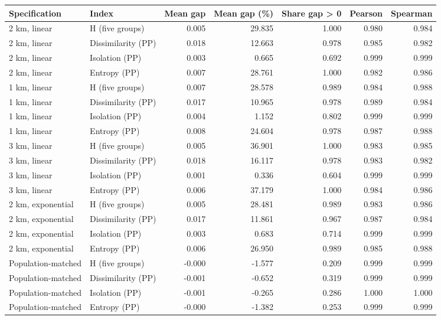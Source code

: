 \begin{tabular}{llrrrrr}
\toprule
Specification & Index & Mean gap & Mean gap (\%) & Share gap > 0 & Pearson & Spearman \\
\midrule
2 km, linear & H (five groups) & 0.005 & 29.835 & 1.000 & 0.980 & 0.984 \\
2 km, linear & Dissimilarity (PP) & 0.018 & 12.663 & 0.978 & 0.985 & 0.982 \\
2 km, linear & Isolation (PP) & 0.003 & 0.665 & 0.692 & 0.999 & 0.999 \\
2 km, linear & Entropy (PP) & 0.007 & 28.761 & 1.000 & 0.982 & 0.986 \\
1 km, linear & H (five groups) & 0.007 & 28.578 & 0.989 & 0.984 & 0.988 \\
1 km, linear & Dissimilarity (PP) & 0.017 & 10.965 & 0.978 & 0.989 & 0.984 \\
1 km, linear & Isolation (PP) & 0.004 & 1.152 & 0.802 & 0.999 & 0.999 \\
1 km, linear & Entropy (PP) & 0.008 & 24.604 & 0.978 & 0.987 & 0.988 \\
3 km, linear & H (five groups) & 0.005 & 36.901 & 1.000 & 0.983 & 0.985 \\
3 km, linear & Dissimilarity (PP) & 0.018 & 16.117 & 0.978 & 0.983 & 0.982 \\
3 km, linear & Isolation (PP) & 0.001 & 0.336 & 0.604 & 0.999 & 0.999 \\
3 km, linear & Entropy (PP) & 0.006 & 37.179 & 1.000 & 0.984 & 0.986 \\
2 km, exponential & H (five groups) & 0.005 & 28.481 & 0.989 & 0.983 & 0.986 \\
2 km, exponential & Dissimilarity (PP) & 0.017 & 11.861 & 0.967 & 0.987 & 0.984 \\
2 km, exponential & Isolation (PP) & 0.003 & 0.683 & 0.714 & 0.999 & 0.999 \\
2 km, exponential & Entropy (PP) & 0.006 & 26.950 & 0.989 & 0.985 & 0.988 \\
Population-matched & H (five groups) & -0.000 & -1.577 & 0.209 & 0.999 & 0.999 \\
Population-matched & Dissimilarity (PP) & -0.001 & -0.652 & 0.319 & 0.999 & 0.999 \\
Population-matched & Isolation (PP) & -0.001 & -0.265 & 0.286 & 1.000 & 1.000 \\
Population-matched & Entropy (PP) & -0.000 & -1.382 & 0.253 & 0.999 & 0.999 \\
\bottomrule
\end{tabular}
